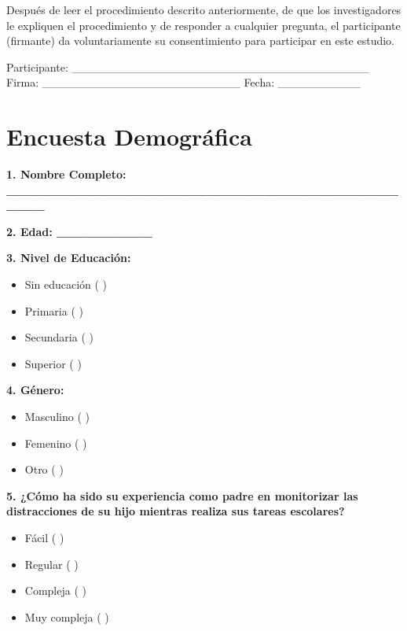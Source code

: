 \documentclass[a4paper,fleqn]{cas-sc}
\begin{document}
	Después de leer el procedimiento descrito anteriormente, de que los investigadores le expliquen el procedimiento y de responder a cualquier pregunta, el participante (firmante) da voluntariamente su consentimiento para participar en este estudio.
	
	\vspace{0.5cm}
	\noindent
	Participante: \_\_\_\_\_\_\_\_\_\_\_\_\_\_\_\_\_\_\_\_\_\_\_\_\_\_\_\_\_\_\_\_\_\_\_\_
	Firma: \_\_\_\_\_\_\_\_\_\_\_\_\_\_\_\_\_\_\_\_\_\_\_\_
	Fecha: \_\_\_\_\_\_\_\_\_\_
	
	\clearpage
	\section[\appendixname~\thesection]{Encuesta Demográfica} \label{Appendix:DemographicSurvey}
	\vspace{12pt}
	\noindent
	\textbf{1. Nombre Completo: \_\_\_\_\_\_\_\_\_\_\_\_\_\_\_\_\_\_\_\_\_\_\_\_\_\_\_\_\_\_\_\_\_\_\_\_\_\_\_\_\_\_\_\_\_}
	
	\vspace{12pt}
	\noindent
	\textbf{2. Edad: \_\_\_\_\_\_\_\_\_\_}
	
	\vspace{12pt}
	\noindent				
	\textbf{3. Nivel de Educación:}
	
	\begin{itemize}
		\item Sin educación ( )
		\item Primaria ( )
		\item Secundaria ( )
		\item Superior ( )
	\end{itemize}
	
	\noindent
	\textbf{4. Género:}
	
	\begin{itemize}
		\item Masculino ( )
		\item Femenino ( )
		\item Otro ( )
	\end{itemize}
	
	\noindent
	\textbf{5. ¿Cómo ha sido su experiencia como padre en monitorizar las distracciones de su hijo mientras realiza sus tareas escolares?}
	
	\begin{itemize}
		\item Fácil ( )
		\item Regular ( )
		\item Compleja ( )
		\item Muy compleja ( )
	\end{itemize}
	
\end{document}
